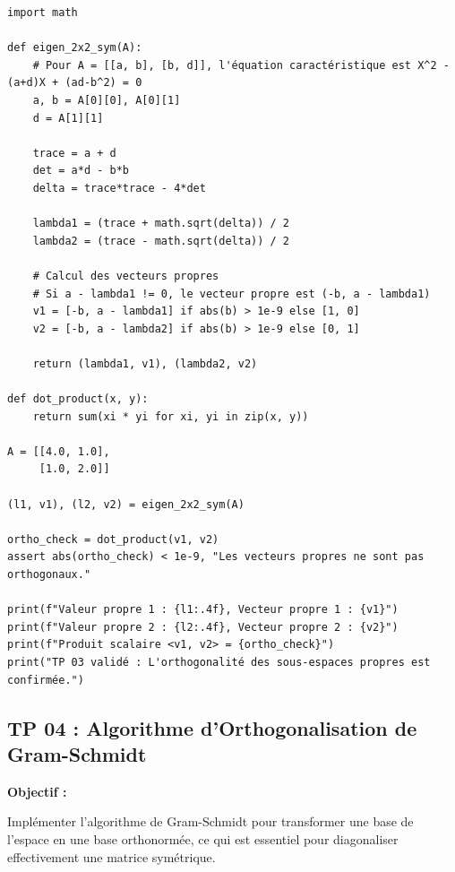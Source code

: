 \documentclass[11pt,a4paper]{article}
\begin{document}
\begin{lstlisting}
import math

def eigen_2x2_sym(A):
    # Pour A = [[a, b], [b, d]], l'équation caractéristique est X^2 - (a+d)X + (ad-b^2) = 0
    a, b = A[0][0], A[0][1]
    d = A[1][1]

    trace = a + d
    det = a*d - b*b
    delta = trace*trace - 4*det

    lambda1 = (trace + math.sqrt(delta)) / 2
    lambda2 = (trace - math.sqrt(delta)) / 2

    # Calcul des vecteurs propres
    # Si a - lambda1 != 0, le vecteur propre est (-b, a - lambda1)
    v1 = [-b, a - lambda1] if abs(b) > 1e-9 else [1, 0]
    v2 = [-b, a - lambda2] if abs(b) > 1e-9 else [0, 1]

    return (lambda1, v1), (lambda2, v2)

def dot_product(x, y):
    return sum(xi * yi for xi, yi in zip(x, y))

A = [[4.0, 1.0],
     [1.0, 2.0]]

(l1, v1), (l2, v2) = eigen_2x2_sym(A)

ortho_check = dot_product(v1, v2)
assert abs(ortho_check) < 1e-9, "Les vecteurs propres ne sont pas orthogonaux."

print(f"Valeur propre 1 : {l1:.4f}, Vecteur propre 1 : {v1}")
print(f"Valeur propre 2 : {l2:.4f}, Vecteur propre 2 : {v2}")
print(f"Produit scalaire <v1, v2> = {ortho_check}")
print("TP 03 validé : L'orthogonalité des sous-espaces propres est confirmée.")
\end{lstlisting}

\subsection*{TP 04 : Algorithme d'Orthogonalisation de Gram-Schmidt}

\textbf{Objectif :}

Implémenter l'algorithme de Gram-Schmidt pour transformer une base de l'espace en une base orthonormée, ce qui est essentiel pour diagonaliser effectivement une matrice symétrique.
\end{document}
